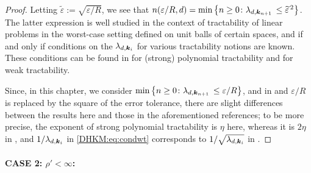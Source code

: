 \documentclass[USenglish]{article}
\theoremstyle{dgthm}
\theoremstyle{dgthm}
\theoremstyle{dgthm}
\theoremstyle{dgthm}
\theoremstyle{dgdef}
\theoremstyle{definition}
\begin{document}
\begin{proof}
Letting $\widetilde{\varepsilon}:=\sqrt{\varepsilon/R}$, we see that 
$n(\varepsilon/R,d)=\min \left \{n\geq 0\colon \lambda_{d,{\boldsymbol{k}}_{n+1}} \,\leq \widetilde{\varepsilon}^{\,2} \right \}$. The latter expression is well studied in the context of tractability of linear problems in the worst-case setting defined on unit balls of certain spaces, and if and only if conditions on the $\lambda_{d,{\boldsymbol{k}}_i}$ for various tractability notions are known. These conditions can be found in \cite[Chapter 5]{NovWoz08a} for (strong) polynomial tractability and  \cite{WerWoz17} for weak tractability.

Since, in this chapter, we consider $\min \left \{n\geq 0\colon \lambda_{d,{\boldsymbol{k}}_{n+1}} \,\leq \varepsilon/R \right \}$, and in \cite{NovWoz08a} and \cite{WerWoz17} $\varepsilon /R$ is replaced by the square of the error tolerance,
there are slight differences between the results here and those in the aforementioned references; to be more precise, the exponent of strong polynomial tractability is $\eta$ here, whereas it is $2\eta$ in \cite{NovWoz08a}, and $1/\lambda_{d,{\boldsymbol{k}}_i}$ in \eqref{DHKM:eq:condwt} corresponds to $1/\sqrt{\lambda_{d,{\boldsymbol{k}}_i}}$ in \cite{WerWoz17}. 
\end{proof}

\paragraph*{CASE 2: $\rho'<\infty$:} 
\end{document}
